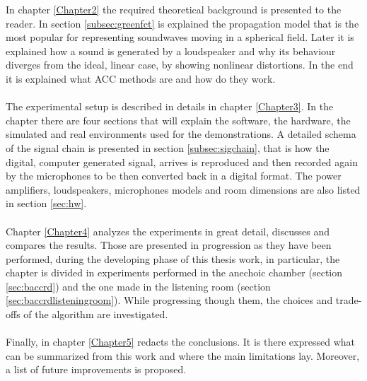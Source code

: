 In chapter \ref{Chapter2} the required theoretical background is presented to the reader. In section \ref{subsec:greenfct} is explained the propagation model that is the most popular for representing soundwaves moving in a spherical field. Later it is explained how a sound is generated by a loudspeaker and why its behaviour diverges from the ideal, linear case, by showing nonlinear distortions. In the end it is explained what ACC methods are and how do they work.
\\
\\
The experimental setup is described in details in chapter \ref{Chapter3}. In the chapter there are four sections that will explain the software, the hardware, the simulated and real environments used for the demonstrations. A detailed schema of the signal chain is presented in section \ref{subsec:sigchain}, that is how the digital, computer generated signal, arrives is reproduced and then recorded again by the microphones to be then converted back in a digital format. The power amplifiers, loudspeakers, microphones models and room dimensions are also listed in section \ref{sec:hw}.
\\
\\
Chapter \ref{Chapter4} analyzes the experiments in great detail, discusses and compares the results. Those are presented in progression as they have been performed, during the developing phase of this thesis work, in particular, the chapter is divided in experiments performed in the anechoic chamber (section \ref{sec:baccrd}) and the one made in the listening room (section \ref{sec:baccrdlisteningroom}). While progressing though them, the choices and trade-offs of the algorithm are investigated.
\\
\\
Finally, in chapter \ref{Chapter5} redacts the conclusions. It is there expressed what can be summarized from this work and where the main limitations lay. Moreover, a list of future improvements is proposed. 
